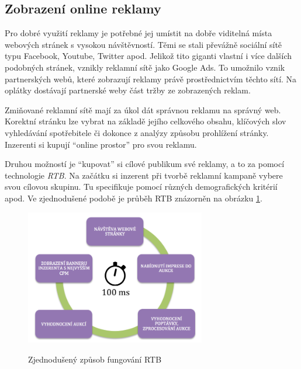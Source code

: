     \subsection{Zobrazení online reklamy}
    Pro dobré využití reklamy je potřebné jej umístit na dobře viditelná místa webových stránek s vysokou návštěvností.
    Těmi se stali převážně sociální sítě typu Facebook, Youtube, Twitter apod. Jelikož tito giganti vlastní i více dalších podobných stránek,
    vznikly reklamní sítě jako Google Ads. To umožnilo vznik partnerských webů, které zobrazují reklamy právě prostřednictvím těchto sítí.
    Na oplátky dostávají partnerské weby část tržby ze zobrazených reklam.

    Zmiňované reklamní sítě mají za úkol dát správnou reklamu na správný web.
    Korektní stránku lze vybrat na základě jejího celkového obsahu, klíčových slov vyhledávání spotřebitele či dokonce z analýzy způsobu prohlížení stránky.
    Inzerenti si kupují \enquote{online prostor} pro svou reklamu. 

    Druhou možností je \enquote{kupovat} si cílové publikum své reklamy, a to za pomocí technologie \emph{RTB}.
    Na začátku si inzerent při tvorbě reklamní kampaně vybere svou cílovou skupinu. Tu specifikuje pomocí různých demografických kritérií apod.
    Ve zjednodušené podobě je průběh RTB znázorněn na obrázku \ref{fig:rtb}.

    \begin{figure}[h]
        \centering
        \caption[Fungování RTB]{Zjednodušený způsob fungování RTB \cite{rtb}}
        \includegraphics[width=0.7\textwidth]{Figures/rtb.png}
        \label{fig:rtb}
    \end{figure}

\endinput